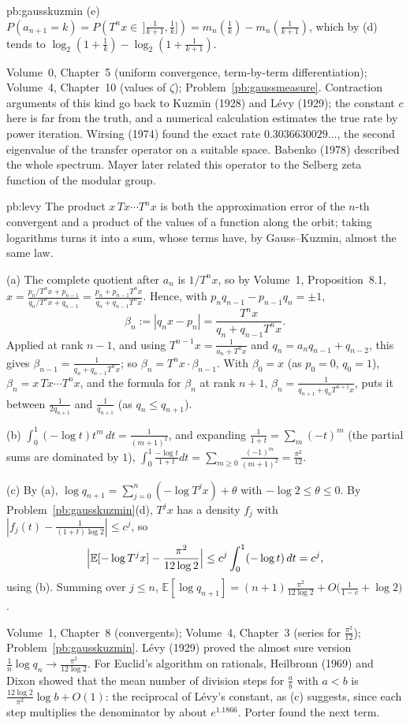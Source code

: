 \begin{solution}{pb:gausskuzmin}
(e) $P(a_{n+1}=k)=P(T^nx\in\,]\frac1{k+1},\frac1k])=m_n(\frac1k)-m_n(\frac1{k+1})$, which by (d) tends to
$\log_2(1+\frac1k)-\log_2(1+\frac1{k+1})$.

\tools Volume~0, Chapter~5 (uniform convergence, term-by-term differentiation); Volume~4, Chapter~10 (values of $\zeta$); Problem~\ref{pb:gaussmeasure}.
\leads Contraction arguments of this kind go back to Kuzmin (1928) and Lévy (1929); the constant $c$ here is far from the
truth, and a numerical calculation estimates the true rate by power iteration. Wirsing (1974) found the exact rate $0.3036630029\ldots$, the second eigenvalue of the transfer
operator on a suitable space. Babenko (1978) described the whole spectrum. Mayer later related this operator to the Selberg zeta
function of the modular group.
\end{solution}

\begin{solution}{pb:levy}
\idea The product $x\,Tx\cdots T^nx$ is both the approximation error of the $n$-th convergent and a product of the values of a
function along the orbit; taking logarithms turns it into a sum, whose terms have, by Gauss--Kuzmin, almost the same law.

\writeup (a) The complete quotient after $a_n$ is $1/T^nx$, so by Volume~1, Proposition~8.1, $x=\frac{p_n/T^nx+p_{n-1}}{q_n/T^nx+q_{n-1}}=\frac{p_n+p_{n-1}T^nx}{q_n+q_{n-1}T^nx}$.
Hence, with $p_nq_{n-1}-p_{n-1}q_n=\pm1$,
\[
\beta_n:=|q_nx-p_n|=\frac{T^nx}{q_n+q_{n-1}T^nx}.
\]
Applied at rank $n-1$, and using $T^{n-1}x=\frac1{a_n+T^nx}$ and $q_n=a_nq_{n-1}+q_{n-2}$, this gives $\beta_{n-1}=\frac1{q_n+q_{n-1}T^nx}$;
so $\beta_n=T^nx\cdot\beta_{n-1}$. With $\beta_0=x$ (as $p_0=0$, $q_0=1$), $\beta_n=x\,Tx\cdots T^nx$, and the formula for $\beta_n$ at rank
$n+1$, $\beta_n=\frac1{q_{n+1}+q_nT^{n+1}x}$, puts it between $\frac1{2q_{n+1}}$ and $\frac1{q_{n+1}}$ (as $q_n\le q_{n+1}$).

(b) $\int_0^1(-\log t)t^m\,dt=\frac1{(m+1)^2}$, and expanding $\frac1{1+t}=\sum_m(-t)^m$ (the partial sums are dominated by $1$),
$\int_0^1\frac{-\log t}{1+t}dt=\sum_{m\ge0}\frac{(-1)^m}{(m+1)^2}=\frac{\pi^2}{12}$.

(c) By (a), $\log q_{n+1}=\sum_{j=0}^n(-\log T^jx)+\theta$ with $-\log2\le\theta\le0$. By Problem~\ref{pb:gausskuzmin}(d), $T^jx$ has a density
$f_j$ with $|f_j(t)-\frac1{(1+t)\log2}|\le c^j$, so
\[
\Bigl|\mathbb E[-\log T^jx]-\frac{\pi^2}{12\log2}\Bigr|\le c^j\int_0^1(-\log t)\,dt=c^j,
\]
using (b). Summing over $j\le n$, $\mathbb E[\log q_{n+1}]=(n+1)\frac{\pi^2}{12\log2}+O\bigl(\frac1{1-c}+\log2\bigr)$.

\tools Volume~1, Chapter~8 (convergents); Volume~4, Chapter~3 (series for $\frac{\pi^2}{12}$); Problem~\ref{pb:gausskuzmin}.
\leads Lévy (1929) proved the almost sure version $\frac1n\log q_n\to\frac{\pi^2}{12\log2}$. For Euclid's algorithm on rationals,
Heilbronn (1969) and Dixon showed that the mean number of division steps for $\frac ab$ with $a<b$ is $\frac{12\log2}{\pi^2}\log b+O(1)$:
the reciprocal of Lévy's constant, as (c) suggests, since each step multiplies the denominator by about $e^{1.1866}$. Porter found
the next term.
\end{solution}


